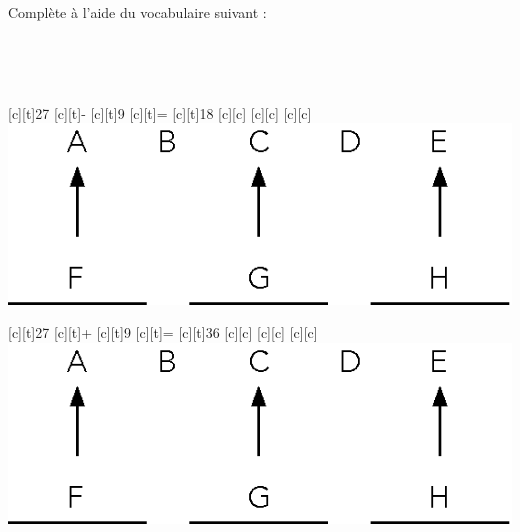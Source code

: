 \documentclass[a4paper,11pt]{report}
\begin{document}
\begin{exop}{
Complète à l'aide du vocabulaire suivant :
\begin{center}
 $\quad$  $\quad$  $\quad$  $\quad$
\end{center}
\begin{center}
 $\quad$
 $\quad$
 $\quad$
 $\quad$
\end{center}

\begin{minipage}{0,45\linewidth}
\begin{center}
\begin{psfrags}
[c][t]{27}
[c][t]{-}
[c][t]{9}
[c][t]{=}
[c][t]{18}
[c][c]{{{{\color{blue} }}}}
[c][c]{{{{\color{blue} }}}}
[c][c]{{{{\color{blue} }}}}
\includegraphics[scale=1]{media/no-30/vocabulaire4op.eps}
\end{psfrags}
\end{center}
\end{minipage}
\hfill
\begin{minipage}{0,45\linewidth}
\begin{center}
\begin{psfrags}
[c][t]{27}
[c][t]{+}
[c][t]{9}
[c][t]{=}
[c][t]{36}
[c][c]{{{{\color{blue} }}}}
[c][c]{{{{\color{blue} }}}}
[c][c]{{{{\color{blue} }}}}
\includegraphics[scale=1]{media/no-30/vocabulaire4op.eps}
\end{psfrags}
\end{center}
\end{minipage}



}
\end{exop}
\end{document}
